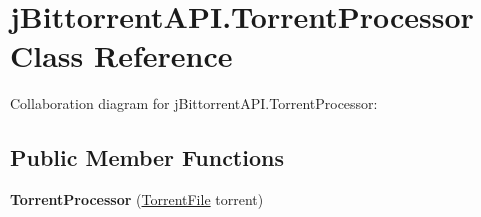 \hypertarget{classj_bittorrent_a_p_i_1_1_torrent_processor}{
\section{jBittorrentAPI.TorrentProcessor Class Reference}
\label{classj_bittorrent_a_p_i_1_1_torrent_processor}
}
Collaboration diagram for jBittorrentAPI.TorrentProcessor:\subsection*{Public Member Functions}
\begin{DoxyCompactItemize}
\item 
\hypertarget{classj_bittorrent_a_p_i_1_1_torrent_processor_af6d631ae929512d9a4ff44b4bec635ae}{
{\bfseries TorrentProcessor} (\hyperlink{classj_bittorrent_a_p_i_1_1_torrent_file}{TorrentFile} torrent)}
\label{classj_bittorrent_a_p_i_1_1_torrent_processor_af6d631ae929512d9a4ff44b4bec635ae}


\end{DoxyCompactItemize}

